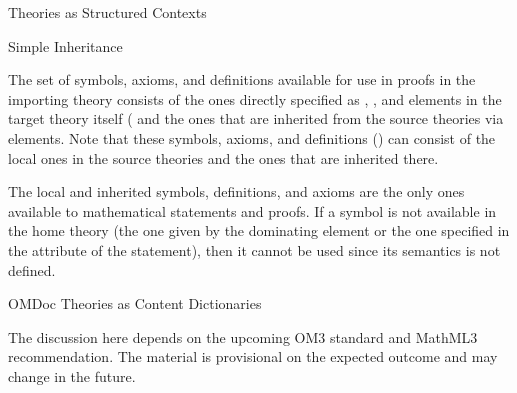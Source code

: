 \begin{omgroup}[short=Mathematical Statements,id=statements]
\begin{omgroup}[id=theories-contexts]{Theories as Structured Contexts}
\begin{module}[id=theories]
\begin{omgroup}[id=inheritance]{Simple Inheritance}
\begin{omtext}
  The set of symbols, axioms, and definitions available for use in proofs in the importing
  theory consists of the ones directly specified as {}, {},
  and {} elements in the target theory itself ( and the ones that are inherited from
  the source theories via {} elements.  Note that these symbols, axioms,
  and definitions () can consist of the local
  ones in the source theories and the ones that are inherited there.
\end{omtext}

The local and inherited symbols, definitions, and axioms are the only ones
available to mathematical statements and proofs. If a symbol is not available in
the home theory (the one given by the dominating {} element or the
one specified in the {} attribute of the statement),
then it cannot be used since its semantics is not defined.
\end{omgroup}

\begin{omgroup}[id=identifying]{OMDoc Theories as Content Dictionaries}
\begin{oldpart}{The discussion here depends on the upcoming OM3 standard and MathML3
    recommendation. The material is provisional on the expected outcome and may change in
    the future.}



\end{oldpart}
\end{omgroup}
\end{module}
\end{omgroup}
\end{omgroup}
